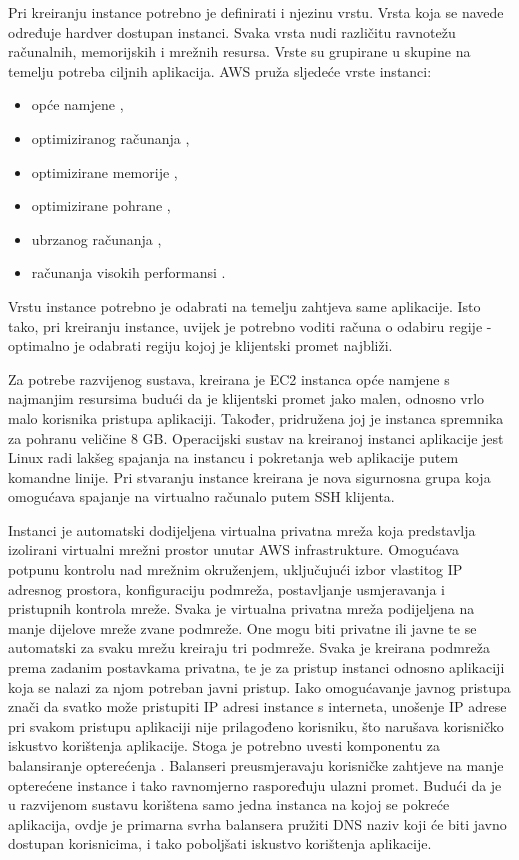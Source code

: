 Pri kreiranju instance potrebno je definirati i njezinu vrstu. Vrsta koja se navede određuje hardver dostupan instanci. Svaka vrsta nudi različitu ravnotežu računalnih, memorijskih i mrežnih resursa. Vrste su grupirane u skupine na temelju potreba ciljnih aplikacija. AWS pruža sljedeće vrste instanci:
\begin{itemize}
	\item opće namjene , 
	\item optimiziranog računanja ,
	\item optimizirane memorije ,
	\item optimizirane pohrane , 
	\item ubrzanog računanja ,
	\item računanja visokih performansi .
\end{itemize}

Vrstu instance potrebno je odabrati na temelju zahtjeva same aplikacije. Isto tako, pri kreiranju instance, uvijek je potrebno voditi računa o odabiru regije - optimalno je odabrati regiju kojoj je klijentski promet najbliži.

Za potrebe razvijenog sustava, kreirana je EC2 instanca opće namjene s najmanjim resursima budući da je klijentski promet jako malen, odnosno vrlo malo korisnika pristupa aplikaciji. Također, pridružena joj je instanca spremnika za pohranu veličine 8 GB. Operacijski sustav na kreiranoj instanci aplikacije jest Linux radi lakšeg spajanja na instancu i pokretanja web aplikacije putem komandne linije. Pri stvaranju instance kreirana je nova sigurnosna grupa koja omogućava spajanje na virtualno računalo putem SSH klijenta.

Instanci je automatski dodijeljena virtualna privatna mreža  koja predstavlja izolirani virtualni mrežni prostor unutar AWS infrastrukture. Omogućava potpunu kontrolu nad mrežnim okruženjem, uključujući izbor vlastitog IP adresnog prostora, konfiguraciju podmreža, postavljanje usmjeravanja i pristupnih kontrola mreže. Svaka je virtualna privatna mreža podijeljena na manje dijelove mreže zvane podmreže. One mogu biti privatne ili javne te se automatski za svaku mrežu kreiraju tri podmreže. Svaka je kreirana podmreža prema zadanim postavkama privatna, te je za pristup instanci odnosno aplikaciji koja se nalazi za njom potreban javni pristup. Iako omogućavanje javnog pristupa znači da svatko može pristupiti IP adresi instance s interneta, unošenje IP adrese pri svakom pristupu aplikaciji nije prilagođeno korisniku, što narušava korisničko iskustvo korištenja aplikacije. Stoga je potrebno uvesti komponentu za balansiranje opterećenja . Balanseri preusmjeravaju korisničke zahtjeve na manje opterećene instance i tako ravnomjerno raspoređuju ulazni promet. Budući da je u razvijenom sustavu korištena samo jedna instanca na kojoj se pokreće aplikacija, ovdje je primarna svrha balansera pružiti DNS naziv koji će biti javno dostupan korisnicima, i tako poboljšati iskustvo korištenja aplikacije. 

